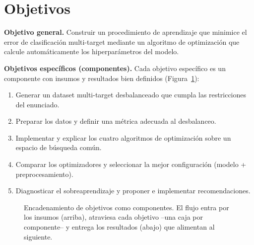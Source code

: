 \documentclass[11pt,a4paper,twocolumn]{article}
\begin{document}
\section{Objetivos}
\textbf{Objetivo general.} Construir un procedimiento de aprendizaje que minimice el error de clasificación
multi-target mediante un algoritmo de optimización que calcule automáticamente los hiperparámetros del
modelo.

\noindent\textbf{Objetivos específicos (componentes).} Cada objetivo específico es un componente con
insumos y resultados bien definidos (Figura~\ref{fig:objetivos}):
\begin{enumerate}[leftmargin=1.1em,itemsep=1pt]
\item Generar un dataset multi-target desbalanceado que cumpla las restricciones del enunciado.
\item Preparar los datos y definir una métrica adecuada al desbalanceo.
\item Implementar y explicar los cuatro algoritmos de optimización sobre un espacio de búsqueda común.
\item Comparar los optimizadores y seleccionar la mejor configuración (modelo + preprocesamiento).
\item Diagnosticar el sobreaprendizaje y proponer e implementar recomendaciones.
\end{enumerate}

\begin{figure}[H]
\centering
{}
\caption{Encadenamiento de objetivos como componentes. El flujo entra por los insumos (arriba), atraviesa
cada objetivo --una caja por componente-- y entrega los resultados (abajo) que alimentan al siguiente.}
\label{fig:objetivos}
\end{figure}
\end{document}
